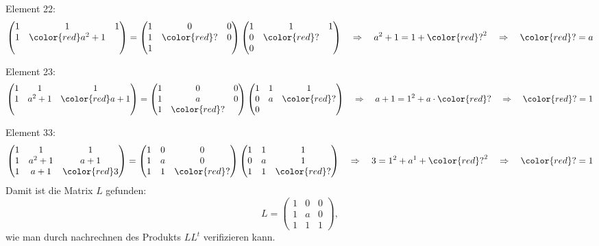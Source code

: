 \begin{loesung}
Element 22:
\[
\begin{pmatrix}
1&               1&1\\
1&\color{red}a^2+1& \\
 &                &
\end{pmatrix}
=
\begin{pmatrix}
1&           0&0\\
1&\color{red}?&0\\
1&            &
\end{pmatrix}
\begin{pmatrix}
1&           1&1\\
0&\color{red}?& \\
0&            &
\end{pmatrix}
\quad\Rightarrow\quad
a^2+1=1+ {\color{red}?}^2
\quad\Rightarrow\quad
{\color{red}?}=a
\]

Element 23:
\[
\begin{pmatrix}
1&1&1\\
1&a^2+1&\color{red}a+1\\
 &     &
\end{pmatrix}
=
\begin{pmatrix}
1&0&0\\
1&a&0\\
1&\color{red}?&
\end{pmatrix}
\begin{pmatrix}
1&1&1\\
0&a&\color{red}?\\
0& &
\end{pmatrix}
\quad\Rightarrow\quad
a+1= 1^2 + a\cdot{\color{red}?}
\quad\Rightarrow\quad
{\color{red}?}=1
\]

Element 33:
\[
\begin{pmatrix}
1&1&1\\
1&a^2+1&a+1\\
1&a+1&\color{red}3
\end{pmatrix}
=
\begin{pmatrix}
1&0&0\\
1&a&0\\
1&1&\color{red}?
\end{pmatrix}
\begin{pmatrix}
1&1&1\\
0&a&1\\
1&1&\color{red}?
\end{pmatrix}
\quad\Rightarrow\quad
3=1^2+a^1+{\color{red}?}^2
\quad\Rightarrow\quad
{\color{red}?}=1
\]
Damit ist die Matrix $L$ gefunden:
\[
L=\begin{pmatrix}
1&0&0\\
1&a&0\\
1&1&1
\end{pmatrix},
\]
wie man durch nachrechnen des Produkts $LL^t$ verifizieren kann.
\end{loesung}

